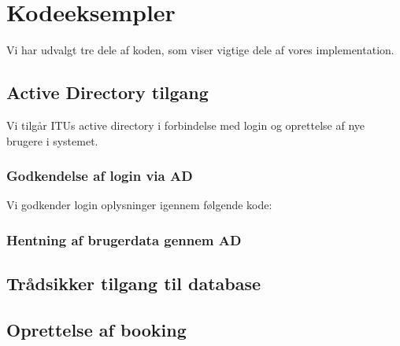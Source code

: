 \section{Kodeeksempler}
\label{Technical_CodeExamples}
Vi har udvalgt tre dele af koden, som viser vigtige dele af vores implementation.
\subsection{Active Directory tilgang}
\label{Technical_CodeExamples_AD}
Vi tilgår ITUs active directory i forbindelse med login og oprettelse af nye brugere i systemet.
\subsubsection{Godkendelse af login via AD}
\label{Technical_CodeExamples_AD_authen}
Vi godkender login oplysninger igennem følgende kode:



\subsubsection{Hentning af brugerdata gennem AD}
\label{Technical_CodeExamples_AD_userdata}



\subsection{Trådsikker tilgang til database}
\label{Technical_CodeExamples_threadstatic}



\subsection{Oprettelse af booking}
\label{Technical_CodeExamples_bookingcreation}